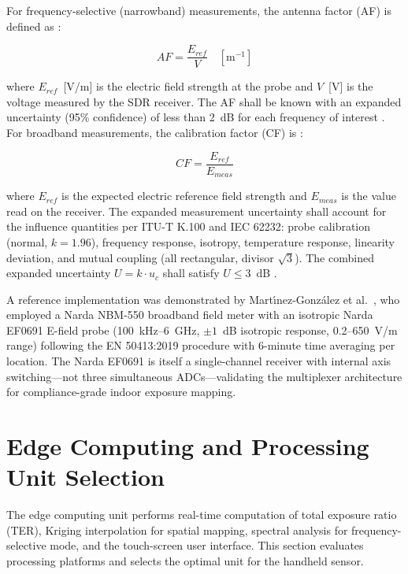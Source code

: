 \documentclass[11pt,a4paper]{article}
\begin{document}
For frequency-selective (narrowband) measurements, the antenna factor (AF) is defined as \cite{itut_k61}:

\begin{equation}
    AF = \frac{E_{ref}}{V} \quad [\text{m}^{-1}]
    \label{eq:antenna_factor}
\end{equation}

\noindent where $E_{ref}$~[V/m] is the electric field strength at the probe and $V$~[V] is the voltage measured by the SDR receiver. The AF shall be known with an expanded uncertainty (95\% confidence) of less than 2~dB for each frequency of interest \cite{itut_k61}. For broadband measurements, the calibration factor (CF) is \cite{itut_k61}:

\begin{equation}
    CF = \frac{E_{ref}}{E_{meas}}
    \label{eq:calibration_factor}
\end{equation}

\noindent where $E_{ref}$ is the expected electric reference field strength and $E_{meas}$ is the value read on the receiver. The expanded measurement uncertainty shall account for the influence quantities per ITU-T K.100 \cite{itut_k100} and IEC 62232: probe calibration (normal, $k=1.96$), frequency response, isotropy, temperature response, linearity deviation, and mutual coupling (all rectangular, divisor $\sqrt{3}$). The combined expanded uncertainty $U = k \cdot u_c$ shall satisfy $U \le 3$~dB \cite{itut_k91, itut_k61}.

A reference implementation was demonstrated by Mart{\'{\i}}nez-Gonz{\'a}lez et al.~\cite{martinezgonzalez_2022}, who employed a Narda NBM-550 broadband field meter with an isotropic Narda EF0691 E-field probe (100~kHz--6~GHz, $\pm 1$~dB isotropic response, 0.2--650~V/m range) following the EN 50413:2019 procedure with 6-minute time averaging per location. The Narda EF0691 is itself a single-channel receiver with internal axis switching---not three simultaneous ADCs---validating the multiplexer architecture for compliance-grade indoor exposure mapping.

\section{Edge Computing and Processing Unit Selection}
\label{sec:edge_processing}

The edge computing unit performs real-time computation of total exposure ratio (TER), Kriging interpolation for spatial mapping, spectral analysis for frequency-selective mode, and the touch-screen user interface. This section evaluates processing platforms and selects the optimal unit for the handheld sensor.
\end{document}
